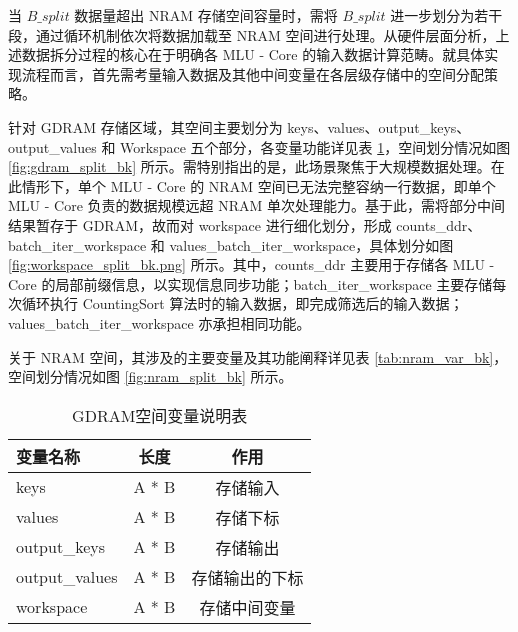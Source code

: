 当 \( B\_split \) 数据量超出 NRAM 存储空间容量时，需将 \( B\_split \) 进一步划分为若干段，通过循环机制依次将数据加载至 NRAM 空间进行处理。从硬件层面分析，上述数据拆分过程的核心在于明确各 MLU - Core 的输入数据计算范畴。就具体实现流程而言，首先需考量输入数据及其他中间变量在各层级存储中的空间分配策略。  

针对 GDRAM 存储区域，其空间主要划分为 keys、values、output\_keys、output\_values 和 Workspace 五个部分，各变量功能详见表 \ref{tab:gdram_var_bk}，空间划分情况如图 \ref{fig:gdram_split_bk} 所示。需特别指出的是，此场景聚焦于大规模数据处理。在此情形下，单个 MLU - Core 的 NRAM 空间已无法完整容纳一行数据，即单个 MLU - Core 负责的数据规模远超 NRAM 单次处理能力。基于此，需将部分中间结果暂存于 GDRAM，故而对 workspace 进行细化划分，形成 counts\_ddr、batch\_iter\_workspace 和 values\_batch\_iter\_workspace，具体划分如图 \ref{fig:workspace_split_bk.png} 所示。其中，counts\_ddr 主要用于存储各 MLU - Core 的局部前缀信息，以实现信息同步功能；batch\_iter\_workspace 主要存储每次循环执行 CountingSort 算法时的输入数据，即完成筛选后的输入数据；values\_batch\_iter\_workspace 亦承担相同功能。  

关于 NRAM 空间，其涉及的主要变量及其功能阐释详见表 \ref{tab:nram_var_bk}，空间划分情况如图 \ref{fig:nram_split_bk} 所示。

\begin{table}
    \caption{GDRAM空间变量说明表}
    \centering
    \begin{tabular}{lcc}
    \toprule
    变量名称 & 长度 & 作用 \\
    \midrule
    keys & A * B & 存储输入 \\
    values & A * B & 存储下标 \\
    output\_keys & A * B & 存储输出 \\
    output\_values & A * B & 存储输出的下标 \\
    workspace & A * B & 存储中间变量 \\
    \bottomrule
    \end{tabular}
    \label{tab:gdram_var_bk}
\end{table}



